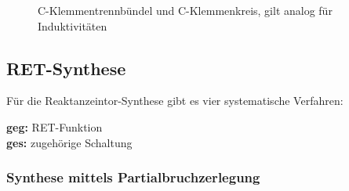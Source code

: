 \begin{figure}[!ht]
\centering
\subfloat[C-Klemmentrennbündel]{
	
	\label{fig:ret:klemmenbuendel}
}
\qquad
\subfloat[C-Klemmenkreis]{
	
	\label{fig:ret:klemmenkreis} 
}
\caption[Klemmentrennbündel und Klemmenkreis]{C-Klemmentrennbündel und
C-Klemmenkreis, gilt analog für Induktivitäten}
\label{fig:ret}
\end{figure}




\subsection{RET-Synthese}
Für die Reaktanzeintor-Synthese gibt es vier systematische Verfahren:

\begin{figure}[H]
\begin{center}
  
\end{center}
\end{figure}

\textbf{geg:} RET-Funktion\\
\textbf{ges:} zugehörige Schaltung\\


\subsubsection{Synthese mittels Partialbruchzerlegung}
